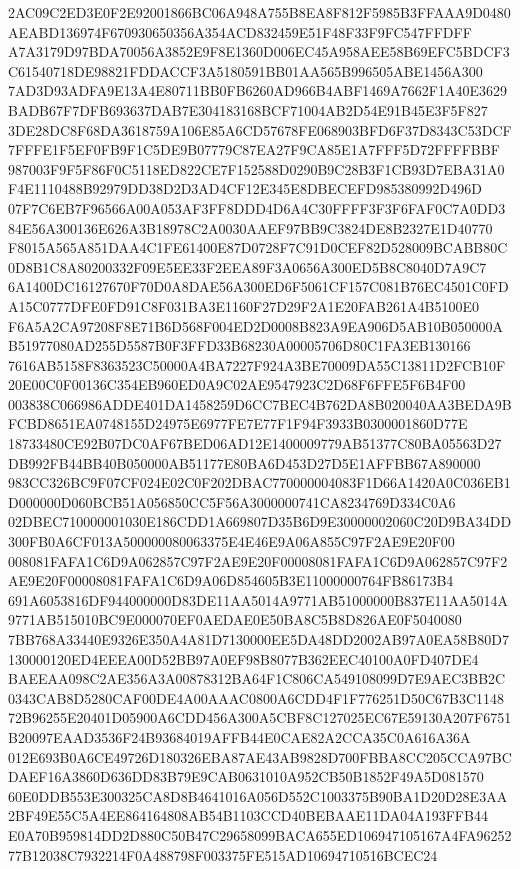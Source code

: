 \documentclass[UTF8,fontset=fandol,zihao=-4,a4paper]{ctexart}
\begin{document}
{{2AC09C2ED3E0F2E92001866BC06A948A755B8EA8F812F5985B3FFAAA9D0480AEABD136974F670930650356A354ACD832459E51F48F33F9FC547FFDFF
A7A3179D97BDA70056A3852E9F8E1360D006EC45A958AEE58B69EFC5BDCF3C61540718DE98821FDDACCF3A5180591BB01AA565B996505ABE1456A300
7AD3D93ADFA9E13A4E80711BB0FB6260AD966B4ABF1469A7662F1A40E3629BADB67F7DFB693637DAB7E304183168BCF71004AB2D54E91B45E3F5F827
3DE28DC8F68DA3618759A106E85A6CD57678FE068903BFD6F37D8343C53DCF7FFFE1F5EF0FB9F1C5DE9B07779C87EA27F9CA85E1A7FFF5D72FFFFBBF
987003F9F5F86F0C5118ED822CE7F152588D0290B9C28B3F1CB93D7EBA31A0F4E1110488B92979DD38D2D3AD4CF12E345E8DBECEFD985380992D496D
07F7C6EB7F96566A00A053AF3FF8DDD4D6A4C30FFFF3F3F6FAF0C7A0DD384E56A300136E626A3B18978C2A0030AAEF97BB9C3824DE8B2327E1D40770
F8015A565A851DAA4C1FE61400E87D0728F7C91D0CEF82D528009BCABB80C0D8B1C8A80200332F09E5EE33F2EEA89F3A0656A300ED5B8C8040D7A9C7
6A1400DC16127670F70D0A8DAE56A300ED6F5061CF157C081B76EC4501C0FDA15C0777DFE0FD91C8F031BA3E1160F27D29F2A1E20FAB261A4B5100E0
F6A5A2CA97208F8E71B6D568F004ED2D0008B823A9EA906D5AB10B050000AB51977080AD255D5587B0F3FFD33B68230A00005706D80C1FA3EB130166
7616AB5158F8363523C50000A4BA7227F924A3BE70009DA55C13811D2FCB10F20E00C0F00136C354EB960ED0A9C02AE9547923C2D68F6FFE5F6B4F00
003838C066986ADDE401DA1458259D6CC7BEC4B762DA8B020040AA3BEDA9BFCBD8651EA0748155D24975E6977FE7E77F1F94F3933B0300001860D77E
18733480CE92B07DC0AF67BED06AD12E1400009779AB51377C80BA05563D27DB992FB44BB40B050000AB51177E80BA6D453D27D5E1AFFBB67A890000
983CC326BC9F07CF024E02C0F202DBAC770000004083F1D66A1420A0C036EB1D000000D060BCB51A056850CC5F56A3000000741CA8234769D334C0A6
02DBEC710000001030E186CDD1A669807D35B6D9E30000002060C20D9BA34DD300FB0A6CF013A500000080063375E4E46E9A06A855C97F2AE9E20F00
008081FAFA1C6D9A062857C97F2AE9E20F00008081FAFA1C6D9A062857C97F2AE9E20F00008081FAFA1C6D9A06D854605B3E11000000764FB86173B4
691A6053816DF944000000D83DE11AA5014A9771AB51000000B837E11AA5014A9771AB515010BC9E000070EF0AEDAE0E50BA8C5B8D826AE0F5040080
7BB768A33440E9326E350A4A81D7130000EE5DA48DD2002AB97A0EA58B80D7130000120ED4EEEA00D52BB97A0EF98B8077B362EEC40100A0FD407DE4
BAEEAA098C2AE356A3A00878312BA64F1C806CA549108099D7E9AEC3BB2C0343CAB8D5280CAF00DE4A00AAAC0800A6CDD4F1F776251D50C67B3C1148
72B96255E20401D05900A6CDD456A300A5CBF8C127025EC67E59130A207F6751B20097EAAD3536F24B93684019AFFB44E0CAE82A2CCA35C0A616A36A
012E693B0A6CE49726D180326EBA87AE43AB9828D700FBBA8CC205CCA97BCDAEF16A3860D636DD83B79E9CAB0631010A952CB50B1852F49A5D081570
60E0DDB553E300325CA8D8B4641016A056D552C1003375B90BA1D20D28E3AA2BF49E55C5A4EE864164808AB54B1103CCD40BEBAAE11DA04A193FFB44
E0A70B959814DD2D880C50B47C29658099BACA655ED106947105167A4FA9625277B12038C7932214F0A488798F003375FE515AD10694710516BCEC24
}}
\end{document}
